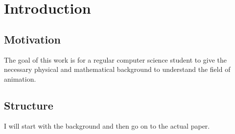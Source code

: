 \chapter{Introduction}
\section{Motivation}
The goal of this work is for a regular computer science student to give the necessary physical and mathematical background to understand the field of animation.

\section{Structure}
I will start with the background and then go on to the actual paper.